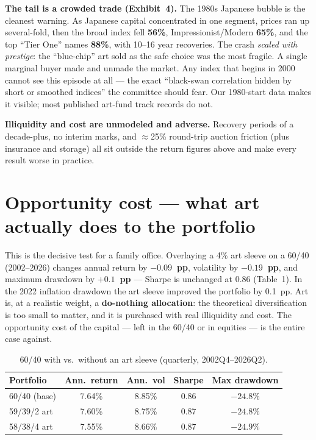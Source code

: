 \documentclass[11pt]{article}
\begin{document}
\textbf{The tail is a crowded trade (Exhibit~4).} The 1980s Japanese bubble is the cleanest warning.
As Japanese capital concentrated in one segment, prices ran up several-fold, then the broad index fell
\textbf{56\%}, Impressionist/Modern \textbf{65\%}, and the top ``Tier One'' names \textbf{88\%}, with
10--16 year recoveries. The crash \emph{scaled with prestige}: the ``blue-chip'' art sold as the safe
choice was the most fragile. A single marginal buyer made and unmade the market. Any index that begins
in 2000 cannot see this episode at all --- the exact ``black-swan correlation hidden by short or
smoothed indices'' the committee should fear. Our 1980-start data makes it visible; most published
art-fund track records do not.

\textbf{Illiquidity and cost are unmodeled and adverse.} Recovery periods of a decade-plus, no interim
marks, and \(\approx\)25\% round-trip auction friction (plus insurance and storage) all sit outside
the return figures above and make every result worse in practice.

\section{Opportunity cost --- what art actually does to the portfolio}
This is the decisive test for a family office. Overlaying a 4\% art sleeve on a 60/40 (2002--2026)
changes annual return by \textbf{$-0.09$~pp}, volatility by \textbf{$-0.19$~pp}, and maximum drawdown
by \textbf{$+0.1$~pp} --- Sharpe is unchanged at 0.86 (Table~1). In the 2022 inflation drawdown the art
sleeve improved the portfolio by 0.1~pp. Art is, at a realistic weight, a \textbf{do-nothing
allocation}: the theoretical diversification is too small to matter, and it is purchased with real
illiquidity and cost. The opportunity cost of the capital --- left in the 60/40 or in equities --- is
the entire case against.

\begin{table}[h]
\centering
\caption{60/40 with vs.\ without an art sleeve (quarterly, 2002Q4--2026Q2).}
\small
\begin{tabular}{lcccc}
\toprule
Portfolio & Ann.\ return & Ann.\ vol & Sharpe & Max drawdown \\
\midrule
60/40 (base) & 7.64\% & 8.85\% & 0.86 & $-24.8\%$ \\
59/39/2 art & 7.60\% & 8.75\% & 0.87 & $-24.8\%$ \\
58/38/4 art & 7.55\% & 8.66\% & 0.87 & $-24.9\%$ \\
\bottomrule
\end{tabular}
\end{table}
\end{document}
